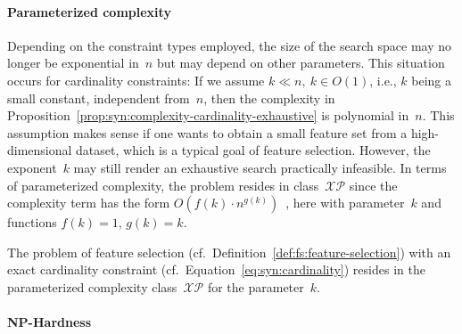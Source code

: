 \paragraph{Parameterized complexity}

Depending on the constraint types employed, the size of the search space may no longer be exponential in~$n$ but may depend on other parameters.
This situation occurs for cardinality constraints:
If we assume $k \ll n,~k \in O(1)$, i.e., $k$ being a small constant, independent from~$n$, then the complexity in Proposition~\ref{prop:syn:complexity-cardinality-exhaustive} is polynomial in~$n$.
This assumption makes sense if one wants to obtain a small feature set from a high-dimensional dataset, which is a typical goal of feature selection.
However, the exponent~$k$ may still render an exhaustive search practically infeasible.
In terms of parameterized complexity, the problem resides in class~$\mathcal{XP}$ since the complexity term has the form $O(f(k) \cdot n^{g(k)})$~\cite{downey1997parameterized}, here with parameter~$k$ and functions $f(k) = 1$, $g(k) = k$.
%
\begin{proposition}
	The problem of feature selection (cf.~Definition~\ref{def:fs:feature-selection}) with an exact cardinality constraint (cf.~Equation~\ref{eq:syn:cardinality}) resides in the parameterized complexity class~$\mathcal{XP}$ for the parameter~$k$.
	\label{prop:syn:complexity-cardinality-xp}
\end{proposition}

\paragraph{NP-Hardness}

